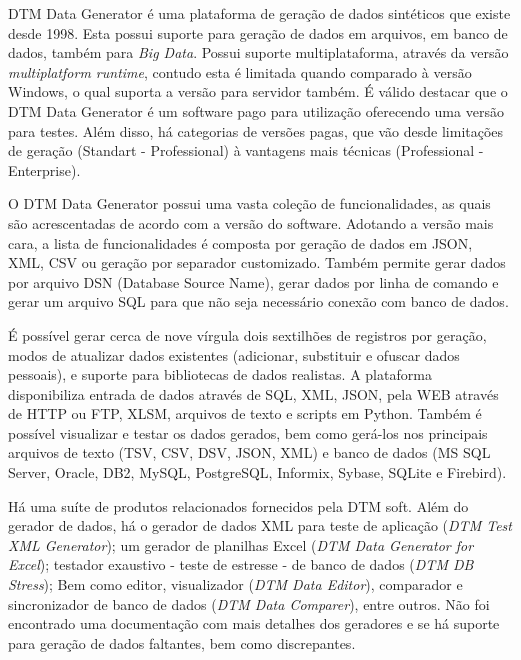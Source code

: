 \documentclass[
	12pt,				%
	openright,			%
	oneside,			%
	a4paper,			%
	english,			%
	brazil				%
	]{abntex2}
\begin{document}
		DTM Data Generator \cite{DTMDataGenerator} é uma plataforma de geração de dados sintéticos que existe desde 1998.
		Esta possui suporte para geração de dados em arquivos, em banco de dados, também para \emph{Big Data}.
		Possui suporte multiplataforma, através da versão \emph{multiplatform runtime}, contudo esta é limitada quando comparado à versão Windows, o qual suporta a versão para servidor também.
		É válido destacar que o DTM Data Generator é um software pago para utilização oferecendo uma versão para testes.
		Além disso, há categorias de versões pagas, que vão desde limitações de geração (Standart - Professional) à vantagens mais técnicas (Professional - Enterprise).
		\par
		O DTM Data Generator possui uma vasta coleção de funcionalidades, as quais são acrescentadas de acordo com a versão do software.
		Adotando a versão mais cara, a lista de funcionalidades é composta por geração de dados em JSON, XML, CSV ou geração por separador customizado.
		Também permite gerar dados por arquivo DSN (Database Source Name), gerar dados por linha de comando e gerar um arquivo SQL para que não seja necessário conexão com banco de dados.
		\par
		É possível gerar cerca de nove vírgula dois sextilhões de registros por geração, modos de atualizar dados existentes (adicionar, substituir e ofuscar dados pessoais), e suporte para bibliotecas de dados realistas.
		A plataforma disponibiliza entrada de dados através de SQL, XML, JSON, pela WEB através de HTTP ou FTP, XLSM, arquivos de texto e scripts em Python.
		Também é possível visualizar e testar os dados gerados, bem como gerá-los nos principais arquivos de texto (TSV, CSV, DSV, JSON, XML) e banco de dados (MS SQL Server, Oracle, DB2, MySQL, PostgreSQL, Informix, Sybase, SQLite e Firebird). 
		\par
		Há uma suíte de produtos relacionados fornecidos pela DTM soft. 
		Além do gerador de dados, 
			há o gerador de dados XML para teste de aplicação (\emph{DTM Test XML Generator});
			um gerador de planilhas Excel (\emph{DTM Data Generator for Excel});
			testador exaustivo - teste de estresse - de banco de dados (\emph{DTM DB Stress});
			Bem como editor, visualizador (\emph{DTM Data Editor}), comparador e sincronizador de banco de dados (\emph{DTM Data Comparer}), entre outros.
		Não foi encontrado uma documentação com mais detalhes dos geradores e se há suporte para geração de dados faltantes, bem como discrepantes.
\end{document}
